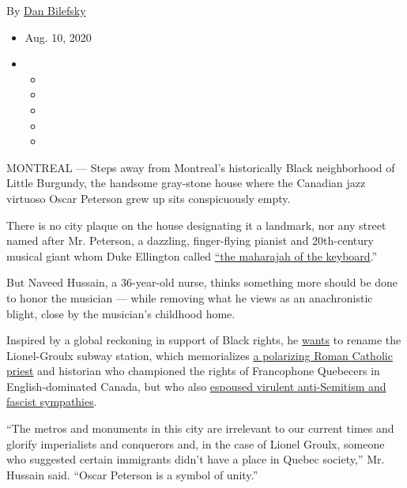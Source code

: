 By \href{https://www.nytimes3xbfgragh.onion/by/dan-bilefsky}{Dan
Bilefsky}

\begin{itemize}
\item
  Aug. 10, 2020
\item
  \begin{itemize}
  \item
  \item
  \item
  \item
  \item
  \end{itemize}
\end{itemize}

MONTREAL --- Steps away from Montreal's historically Black neighborhood
of Little Burgundy, the handsome gray-stone house where the Canadian
jazz virtuoso Oscar Peterson grew up sits conspicuously empty.

There is no city plaque on the house designating it a landmark, nor any
street named after Mr. Peterson, a dazzling, finger-flying pianist and
20th-century musical giant whom Duke Ellington called
\href{https://www.amazon.ae/Oscar-Peterson-Maharaja-Keyboard-Biography/dp/1599860481}{``the
maharajah of the keyboard}.''

But Naveed Hussain, a 36-year-old nurse, thinks something more should be
done to honor the musician --- while removing what he views as an
anachronistic blight, close by the musician's childhood home.

Inspired by a global reckoning in support of Black rights, he
\href{https://www.change.org/p/ville-de-montr\%C3\%A9al-change-lionel-groulx-metro-station-and-rename-it-oscar-peterson-metro-station?recruiter=20620186\&utm_source=share_petition\&utm_medium=facebook\&utm_campaign=psf_combo_share_abi\&utm_term=signature_receipt\&recruited_by_id=5f8fd560-f07c-012f-fc7c-4040aa777426\&utm_content=fht-22876605-en-ca\%3Av12}{wants}
to rename the Lionel-Groulx subway station, which memorializes
\href{https://www.thecanadianencyclopedia.ca/en/article/lionel-adolphe-groulx}{a
polarizing Roman Catholic priest} and historian who championed the
rights of Francophone Quebecers in English-dominated Canada, but who
also
\href{http://faculty.marianopolis.edu/c.belanger/QuebecHistory/docs/jews/Anti-SemitismandQuebecNationalists.html}{espoused
virulent anti-Semitism and fascist sympathies}.

``The metros and monuments in this city are irrelevant to our current
times and glorify imperialists and conquerors and, in the case of Lionel
Groulx, someone who suggested certain immigrants didn't have a place in
Quebec society,'' Mr. Hussain said. ``Oscar Peterson is a symbol of
unity.''

